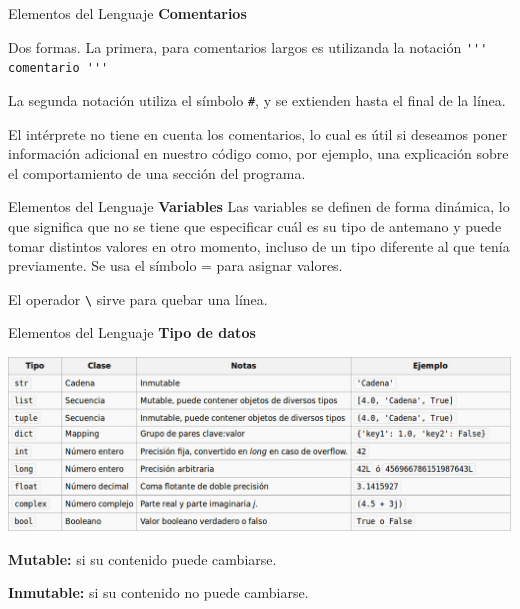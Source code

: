 \documentclass[hyperref={colorlinks=true}]{beamer}
\begin{document}
\begin{frame}[fragile]{Elementos del Lenguaje}
\textbf{Comentarios}

Dos formas. La primera, para comentarios largos es utilizanda la notación \verb~''' comentario '''~

 La segunda notación utiliza el símbolo \verb~#~, y se extienden hasta el final de la línea.

El intérprete no tiene en cuenta los comentarios, lo cual es útil si deseamos poner información adicional en nuestro código como, por ejemplo, una explicación sobre el comportamiento de una sección del programa.

\lstI


\end{frame}



\begin{frame}[fragile]{Elementos del Lenguaje}
\textbf{Variables}
Las variables se definen de forma dinámica, lo que significa que no se tiene que especificar cuál es su tipo de antemano y puede tomar distintos valores en otro momento, incluso de un tipo diferente al que tenía previamente. Se usa el símbolo = para asignar valores.

\lstI

El operador \verb+\+ sirve para quebar una línea.

\end{frame}

\defverbatim[colored]

\begin{frame}[fragile]{Elementos del Lenguaje}
\textbf{Tipo de datos}

\includegraphics[scale=.4]{imagenes/tipo_datos.jpg}

  \textbf{Mutable:} si su contenido puede cambiarse.

    \textbf{Inmutable:} si su contenido no puede cambiarse.

\lstI

\end{frame}
\end{document}

